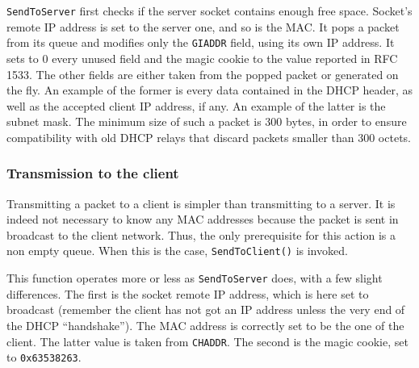 \texttt{SendToServer} first checks if the server socket contains enough free space. Socket's remote IP address is set to the server one, and so is the MAC. It pops a packet from its queue and modifies only the \texttt{GIADDR} field, using its own IP address. It sets to 0 every unused field and the magic cookie to the value reported in RFC 1533. The other fields are either taken from the popped packet or generated on the fly. An example of the former is every data contained in the DHCP header, as well as the accepted client IP address, if any. An example of the latter is the subnet mask. The minimum size of such a packet is 300 bytes, in order to ensure compatibility with old DHCP relays that discard
packets smaller than 300 octets. 

\subsubsection{Transmission to the client}
Transmitting a packet to a client is simpler than transmitting to a server. It is indeed not necessary to know any MAC addresses because the packet is sent in broadcast to the client network. Thus, the only prerequisite for this action is a non empty queue. When this is the case, \texttt{SendToClient()} is invoked.

This function operates more or less as \texttt{SendToServer} does, with a few slight differences. The first is the socket remote IP address, which is here set to broadcast (remember the client has not got an IP address unless the very end of the DHCP ``handshake''). The MAC address is correctly set to be the one of the client. The latter value is taken from \texttt{CHADDR}. The second is the magic cookie, set to \texttt{0x63538263}.